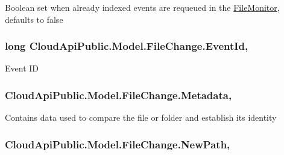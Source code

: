 Boolean set when already indexed events are requeued in the \hyperlink{namespace_file_monitor}{File\-Monitor}, defaults to false 

\hypertarget{class_cloud_api_public_1_1_model_1_1_file_change_aef22ff9ac6993f82e3612d05f093e836}{
\subsubsection[{Event\-Id}]{\setlength{\rightskip}{0pt plus 5cm}long Cloud\-Api\-Public.\-Model.\-File\-Change.\-Event\-Id\hspace{0.3cm}{\ttfamily [get]}, {\ttfamily [set]}}}\label{class_cloud_api_public_1_1_model_1_1_file_change_aef22ff9ac6993f82e3612d05f093e836}


Event I\-D 

\hypertarget{class_cloud_api_public_1_1_model_1_1_file_change_ae4e797c6b4b11f9686e4cb1318dab9a5}{
\subsubsection[{Metadata}]{ Cloud\-Api\-Public.\-Model.\-File\-Change.\-Metadata\hspace{0.3cm}{\ttfamily [get]}, {\ttfamily [set]}}}\label{class_cloud_api_public_1_1_model_1_1_file_change_ae4e797c6b4b11f9686e4cb1318dab9a5}


Contains data used to compare the file or folder and establish its identity 

\hypertarget{class_cloud_api_public_1_1_model_1_1_file_change_ad7383c43cc51606f17c63fad6c032c7c}{
\subsubsection[{New\-Path}]{ Cloud\-Api\-Public.\-Model.\-File\-Change.\-New\-Path\hspace{0.3cm}{\ttfamily [get]}, {\ttfamily [set]}}}\label{class_cloud_api_public_1_1_model_1_1_file_change_ad7383c43cc51606f17c63fad6c032c7c}


